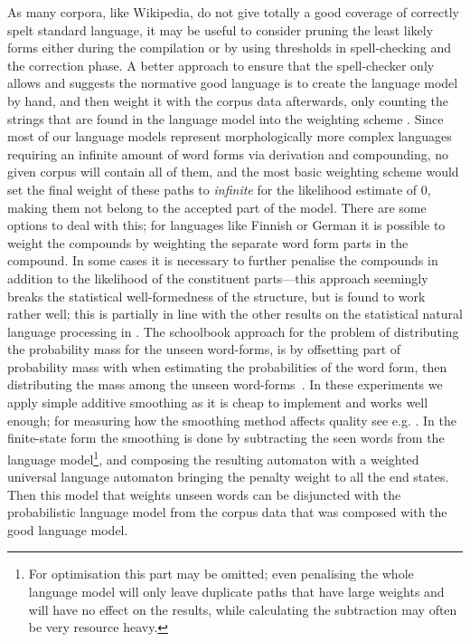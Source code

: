 \documentclass[a4paper,12pt]{article}
\begin{document}
As many corpora, like Wikipedia, do not give totally a good coverage of
correctly spelt standard language, it may be useful to consider pruning the
least likely forms either during the compilation or by using thresholds in
spell-checking and the correction phase. A better approach to ensure that the
spell-checker only allows and suggests the normative good language is to create
the language model by hand, and then weight it with the corpus data afterwards,
only counting the strings that are found in the language model into the
weighting scheme \cite[]{pirinen/2009/nodalida}. Since most of our language
models represent morphologically more complex languages requiring an infinite
amount of word forms via derivation and compounding, no given corpus will
contain all of them, and the most basic weighting scheme would set the final
weight of these paths to \emph{infinite} for the likelihood estimate of 0,
making them not belong to the accepted part of the model. There are some
options to deal with this; for languages like Finnish or German
\cite[]{schiller2006german} it is possible to weight the compounds by weighting
the separate word form parts in the compound.  In some cases it is necessary to
further penalise the compounds in addition to the likelihood of the constituent
parts---this approach seemingly breaks the statistical well-formedness of the
structure, but is found to work rather well; this is partially in line with the
other results on the statistical natural language processing in
\cite{brants2007large}. The schoolbook approach for the problem of distributing
the probability mass for the unseen word-forms, is by offsetting part of
probability mass with when estimating the probabilities of the word form, then
distributing the mass among the unseen word-forms~\cite[for a good introduction
to smoothing models we refer to][]{jurafsky2000speech}. In these experiments we
apply simple additive smoothing as it is cheap to implement and works well
enough; for measuring how the smoothing method affects quality see e.g.
\cite{chen1999empirical}. In the finite-state form the smoothing is done by
subtracting the seen words from the language model\footnote{For optimisation
    this part may be omitted; even penalising the whole language model will
    only leave duplicate paths that have large weights and will have no effect
on the results, while calculating the subtraction may often be very resource
heavy.}, and composing the resulting automaton with a weighted universal
language automaton bringing the penalty weight to all the end states.  Then
this model that weights unseen words can be disjuncted with the probabilistic
language model from the corpus data that was composed with the good language
model.
\end{document}
